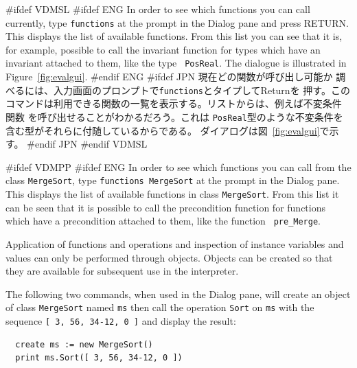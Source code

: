 \documentclass[\pformat,12pt]{article}
\newcommand{\aaa}{\tt }
\newcommand{\cmd}{\tt }
\newcommand{\guicmd}[1]{{\sf #1}}
\newcommand{\guicmd}[1]{{\gt #1}}
\begin{document}
#ifdef VDMSL 
#ifdef ENG
In order to see which functions
you can call 
currently, type {\tt functions} at the prompt in the \guicmd{Dialog}
pane and press RETURN. This displays the list of available
functions. From this list you can see that it is, for example,
possible to call the invariant function for
types which have an invariant attached to them, like the type {\aaa
  PosReal}. The dialogue is illustrated in Figure~\ref{fig:evalgui}.
#endif ENG
#ifdef JPN
現在どの関数が呼び出し可能か
調べるには、\guicmd{入力}画面のプロンプトで{\tt functions}とタイプしてReturnを
押す。このコマンドは利用できる関数の一覧を表示する。リストからは、例えば不変条件
関数
を呼び出せることがわかるだろう。これは
{\aaa PosReal}型のような不変条件を含む型がそれらに付随しているからである。
ダイアログは図~\ref{fig:evalgui}で示す。
#endif JPN
#endif VDMSL

#ifdef VDMPP
#ifdef ENG
In order to see which functions you can call from the class
{\aaa MergeSort}, type {\cmd functions MergeSort} at the
prompt in the
\guicmd{Dialog} pane.  This displays the list of available functions
in class {\aaa MergeSort}.  From this list it can be seen that it is
possible to call the precondition
function for functions which
have a precondition attached to them, like the function {\aaa
  pre\_Merge}.

Application of functions and operations and inspection of instance
variables and values can only be performed through objects.  Objects
can be created so that they are available for subsequent use in the
interpreter.

The following two commands, when used in the \guicmd{Dialog} pane, will
create an object of class {\aaa MergeSort} named {\aaa ms} then call
the operation {\tt Sort} on {\tt ms} with the sequence {\tt [ 3,
  56, 34-12, 0 ]} and display the result:

\begin{verbatim}
  create ms := new MergeSort()
  print ms.Sort([ 3, 56, 34-12, 0 ])
\end{verbatim}
\end{document}
